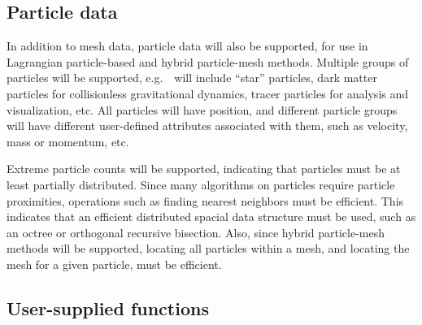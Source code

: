 \documentclass{article}
\begin{document}
\subsection{Particle data}

In addition to mesh data, particle data will also be supported, for
use in Lagrangian particle-based and hybrid particle-mesh methods.
Multiple groups of particles will be supported, e.g.~\enzoii\ will
include ``star'' particles, dark matter particles for collisionless
gravitational dynamics, tracer particles for analysis and
visualization, etc.  All particles will have position, and different particle
groups will have different user-defined attributes associated with them, such
as velocity, mass or momentum, etc.

Extreme particle counts will be supported, indicating that particles
must be at least partially distributed.  Since many algorithms on
particles require particle proximities, operations such as finding
nearest neighbors must be efficient.  This indicates that an efficient
distributed spacial data structure must be used, such as an octree or
orthogonal recursive bisection.  Also, since hybrid particle-mesh
methods will be supported, locating all particles within a mesh, and
locating the mesh for a given particle, must be efficient.


\subsection{User-supplied functions}
\end{document}
